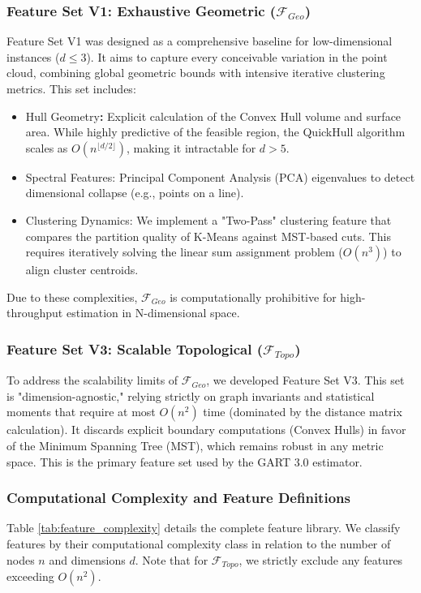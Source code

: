 \documentclass{article}
\begin{document}
\subsubsection{Feature Set V1: Exhaustive Geometric ($\mathcal{F}_{Geo}$)}
Feature Set V1 was designed as a comprehensive baseline for low-dimensional instances ($d \le 3$). It aims to capture every conceivable variation in the point cloud, combining global geometric bounds with intensive iterative clustering metrics.
This set includes:
\begin{itemize}
    \item Hull Geometry\textbf{: }Explicit calculation of the Convex Hull volume and surface area. While highly predictive of the feasible region, the QuickHull algorithm scales as $O(n^{\lfloor d/2 \rfloor})$, making it intractable for $d > 5$.
    \item Spectral Features: Principal Component Analysis (PCA) eigenvalues to detect dimensional collapse (e.g., points on a line).
    \item Clustering Dynamics: We implement a "Two-Pass" clustering feature that compares the partition quality of K-Means against MST-based cuts. This requires iteratively solving the linear sum assignment problem ($O(n^3)$) to align cluster centroids.
\end{itemize}
Due to these complexities, $\mathcal{F}_{Geo}$ is computationally prohibitive for high-throughput estimation in N-dimensional space.

\subsubsection{Feature Set V3: Scalable Topological ($\mathcal{F}_{Topo}$)}
To address the scalability limits of $\mathcal{F}_{Geo}$, we developed Feature Set V3. This set is "dimension-agnostic," relying strictly on graph invariants and statistical moments that require at most $O(n^2)$ time (dominated by the distance matrix calculation). It discards explicit boundary computations (Convex Hulls) in favor of the Minimum Spanning Tree (MST), which remains robust in any metric space. This is the primary feature set used by the GART 3.0 estimator.

\subsubsection{Computational Complexity and Feature Definitions}
Table \ref{tab:feature_complexity} details the complete feature library. We classify features by their computational complexity class in relation to the number of nodes $n$ and dimensions $d$. Note that for $\mathcal{F}_{Topo}$, we strictly exclude any features exceeding $O(n^2)$.
\end{document}
